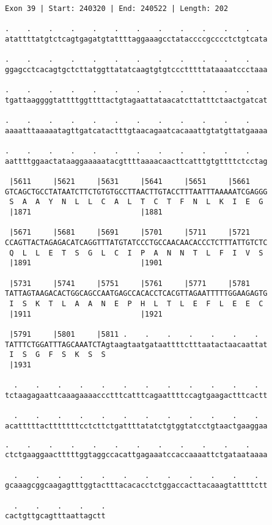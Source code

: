\documentclass{article}
\begin{document}
\begin{Verbatim}[fontfamily=courier]
Exon 39 | Start: 240320 | End: 240522 | Length: 202

.    .    .    .    .    .    .    .    .    .    .    .    
atattttatgtctcagtgagatgtattttaggaaagcctataccccgcccctctgtcata

.    .    .    .    .    .    .    .    .    .    .    .    
ggagcctcacagtgctcttatggttatatcaagtgtgtccctttttataaaatccctaaa

.    .    .    .    .    .    .    .    .    .    .    .    
tgattaaggggtattttggttttactgtagaattataacatcttatttctaactgatcat

.    .    .    .    .    .    .    .    .    .    .    .    
aaaatttaaaaatagttgatcatactttgtaacagaatcacaaattgtatgttatgaaaa

.    .    .    .    .    .    .    .    .    .    .    .    
aattttggaactataaggaaaaatacgttttaaaacaacttcatttgtgttttctcctag

 |5611     |5621     |5631     |5641     |5651     |5661    
GTCAGCTGCCTATAATCTTCTGTGTGCCTTAACTTGTACCTTTAATTTAAAAATCGAGGG
 S  A  A  Y  N  L  L  C  A  L  T  C  T  F  N  L  K  I  E  G 
 |1871                         |1881                        

 |5671     |5681     |5691     |5701     |5711     |5721    
CCAGTTACTAGAGACATCAGGTTTATGTATCCCTGCCAACAACACCCTCTTTATTGTCTC
 Q  L  L  E  T  S  G  L  C  I  P  A  N  N  T  L  F  I  V  S 
 |1891                         |1901                        

 |5731     |5741     |5751     |5761     |5771     |5781    
TATTAGTAAGACACTGGCAGCCAATGAGCCACACCTCACGTTAGAATTTTTGGAAGAGTG
 I  S  K  T  L  A  A  N  E  P  H  L  T  L  E  F  L  E  E  C 
 |1911                         |1921                        

 |5791     |5801     |5811 .    .    .    .    .    .    .  
TATTTCTGGATTTAGCAAATCTAgtaagtaatgataattttctttaatactaacaattat
 I  S  G  F  S  K  S  S                                     
 |1931                                                      

  .    .    .    .    .    .    .    .    .    .    .    .  
tctaagagaattcaaagaaaaccctttcatttcagaattttccagtgaagactttcactt

  .    .    .    .    .    .    .    .    .    .    .    .  
acatttttactttttttcctcttctgattttatatctgtggtatcctgtaactgaaggaa

\end{Verbatim}
\newpage
\begin{Verbatim}[fontfamily=courier]
  .    .    .    .    .    .    .    .    .    .    .    .  
ctctgaaggaactttttggtaggccacattgagaaatccaccaaaattctgataataaaa

  .    .    .    .    .    .    .    .    .    .    .    .  
gcaaagcggcaagagtttggtactttacacacctctggaccacttacaaagtattttctt

  .    .    .    .    .
cactgttgcagtttaattagctt
\end{Verbatim}
\end{document}
